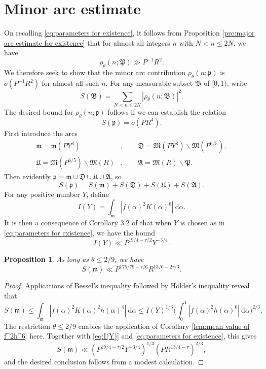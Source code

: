 \documentclass[12pt,english,reqno]{amsart}
\theoremstyle{definition}
\theoremstyle{remark}
\numberwithin{equation}{section}
\numberwithin{equation}{section}
\numberwithin{figure}{section}
\theoremstyle{plain}
\theoremstyle{plain}
\newtheorem{prop}[thm]{Proposition}
\theoremstyle{plain}
\theoremstyle{plain}
\numberwithin{equation}{section}
\numberwithin{thm}{section}
\begin{document}
\section{Minor arc estimate}
On recalling \eqref{eq:parameters for existence}, it follows from
Proposition \ref{pro:major arc estimate for existence} that for almost
all integers $n$ with $N<n\leq2N$, we have
\[
\rho_{\theta}(n;\mathfrak{P})\gg P^{-1}R^{2}.\]
We therefore seek to show that the minor arc contribution $\rho_{\theta}(n;\mathfrak{p})$
is $o(P^{-1}R^{2})$ for almost all such $n$. For any measurable
subset $\mathfrak{B}$ of $[0,1)$, write
\begin{equation}
S(\mathfrak{B})=\sum_{N<n\leq2N}|\rho_{\theta}(n;\mathfrak{B})|^{2}.\label{eq:S(n,B)}\end{equation}
The desired bound for $\rho_{\theta}(n;\mathfrak{p})$ follows if
we can establish the relation
\begin{equation}
S(\mathfrak{p})=o(PR^{4}).\label{eq:aim of minor arc estimate for existence}\end{equation}
First introduce the arcs
\begin{align}
\mathfrak{\mathfrak{m}=\mathfrak{m}}(PY^{3})&,\qquad\mathfrak{D}=\mathfrak{M}(PY^{3})\backslash\mathfrak{M}(P^{6/5}),\nonumber\\ \mathfrak{U}=\mathfrak{M}(P^{6/5})\backslash\mathfrak{M}(R)&,\qquad\mathfrak{A=}\mathfrak{M}(R)\backslash\mathfrak{P}.\label{eq:prunings for existence}\end{align}
Then evidently $\mathfrak{p}=\mathfrak{m}\cup\mathfrak{D}\cup\mathfrak{U}\cup\mathfrak{A}$,
so 
\begin{equation}
S(\mathfrak{p})=S(\mathfrak{m})+S(\mathfrak{D})+S(\mathfrak{U})+S(\mathfrak{A}).\label{eq:splitting for existence}\end{equation}
For any positive number $Y$, define
\[
I(Y)=\int_{\mathfrak{m}}|f(\alpha)^{2}K(\alpha)^{6}|\:\mathrm{d}\alpha.\]
It is then a consequence of Corollary 3.2 of \cite{BrudernWooley2009}
that when $Y$ is chosen as in \eqref{eq:parameters for existence},
we have the bound
\begin{equation}
I(Y)\ll P^{19/4-\tau/2}Y^{-3/4}.\label{eq:I(Y)}\end{equation}
\begin{prop}
\label{pro:S(m)}As long as $\theta\leq2/9$, we have
\[
S(\mathfrak{m})\ll P^{175/79-\tau/6}R^{13/6-2\tau/3}.\]
\end{prop}
\begin{proof}
Applications of Bessel's inequality followed by H\"{o}lder's inequality
reveal that
\begin{equation}
S(\mathfrak{m})\leq\int_{\mathfrak{m}}|f(\alpha)^{2}K(\alpha)^{2}h(\alpha)^{4}|\:\mathrm{d}\alpha\leq I(Y)^{1/3}\Big(\int_{0}^{1}|f(\alpha)^{2}h(\alpha)^{6}|\:\mathrm{d}\alpha\Big)^{2/3}.\end{equation}
The restriction $\theta\leq2/9$ enables the application of Corollary
\ref{lem:mean value of f^2h^6} here. Together with \eqref{eq:I(Y)} and \eqref{eq:parameters for existence}, this gives
\[
S(\mathfrak{m})\ll(P^{19/4-\tau/2}Y^{-3/4})^{1/3}(PR^{13/4-\tau})^{2/3}
,\]
 and the desired conclusion follows from a modest calculation.\end{proof}
\end{document}
